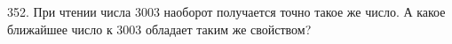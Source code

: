 352. При чтении числа 3003 наоборот получается точно такое же число. А какое ближайшее число
к 3003 обладает таким же свойством?\\
